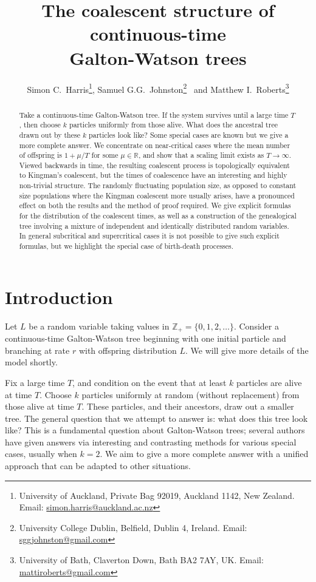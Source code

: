 \documentclass{article}
\author{Simon C.~Harris\thanks{University of Auckland, Private Bag 92019, Auckland 1142, New Zealand. Email: \href{mailto:simon.harris@auckland.ac.nz}{simon.harris@auckland.ac.nz}}, Samuel G.G.~Johnston\thanks{University College Dublin, Belfield, Dublin 4, Ireland. Email: \href{mailto:sggjohnston@gmail.com}{sggjohnston@gmail.com}}~ and Matthew I.~Roberts\thanks{University of Bath, Claverton Down, Bath BA2 7AY, UK. Email: \href{mailto:mattiroberts@gmail.com}{mattiroberts@gmail.com}}}
\title{The coalescent structure of continuous-time\\ Galton-Watson trees}
\theoremstyle{plain}
\theoremstyle{definition}
\newcommand{\R}{\mathbb{R}}
\newcommand{\Z}{\mathbb{Z}}
\begin{document}
\maketitle


\begin{abstract}
Take a continuous-time Galton-Watson tree. If the system survives until a large time $T$, then choose $k$ particles uniformly from those alive. What does the ancestral tree drawn out by these $k$ particles look like? Some special cases are known but we give a more complete answer. We concentrate on near-critical cases where the mean number of offspring is $1+\mu/T$ for some $\mu\in\R$, and show that a scaling limit exists as $T\to\infty$. Viewed backwards in time, the resulting coalescent process is topologically equivalent to Kingman's coalescent, but the times of coalescence have an interesting and highly non-trivial structure. The randomly fluctuating population size, as opposed to constant size populations where the Kingman coalescent more usually arises, have a pronounced effect on both the results and the method of proof required. We give explicit formulas for the distribution of the coalescent times, as well as a construction of the genealogical tree involving a mixture of independent and identically distributed random variables. In general subcritical and supercritical cases it is not possible to give such explicit formulas, but we highlight the special case of birth-death processes.
\end{abstract}






\section{Introduction}
Let $L$ be a random variable taking values in $\Z_+=\{0,1,2,\ldots\}$. Consider a continuous-time Galton-Watson tree beginning with one initial particle and branching at rate $r$ with offspring distribution $L$. We will give more details of the model shortly.

Fix a large time $T$, and condition on the event that at least $k$ particles are alive at time $T$. Choose $k$ particles uniformly at random (without replacement) from those alive at time $T$. These particles, and their ancestors, draw out a smaller tree. The general question that we attempt to answer is: what does this tree look like? This is a fundamental question about Galton-Watson trees; several authors have given answers via interesting and contrasting methods for various special cases, usually when $k=2$. We aim to give a more complete answer with a unified approach that can be adapted to other situations.
\end{document}
